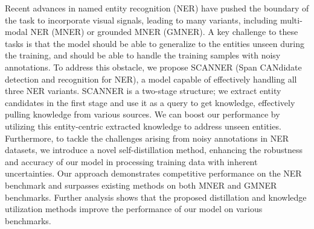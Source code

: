 Recent advances in named entity recognition (NER) have pushed the boundary of the task to incorporate visual signals, leading to many variants, including multi-modal NER (MNER) or grounded MNER (GMNER).  A key challenge to these tasks is that the model should be able to generalize to the entities unseen during the training, and should be able to handle the training samples with noisy annotations. To address this obstacle, we propose SCANNER (Span CANdidate detection and recognition for NER), a model capable of effectively handling all three NER variants. SCANNER is a two-stage structure; we extract entity candidates in the first stage and use it as a query to get knowledge, effectively pulling knowledge from various sources. We can boost our performance by utilizing this entity-centric extracted knowledge to address unseen entities. Furthermore, to tackle the challenges arising from noisy annotations in NER datasets, we introduce a novel self-distillation method, enhancing the robustness and accuracy of our model in processing training data with inherent uncertainties. Our approach demonstrates competitive performance on the NER benchmark and surpasses existing methods on both MNER and GMNER benchmarks. Further analysis shows that the proposed distillation and knowledge utilization methods improve the performance of our model on various benchmarks.